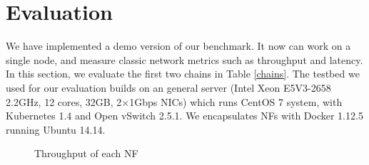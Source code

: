 \section{Evaluation}
We have implemented a demo version of our benchmark.
It now can work on a single node,
and measure classic network metrics such as throughput and latency.
In this section, we evaluate the first two chains in Table \ref{chains}. 
The testbed we used for our evaluation builds on an general server (Intel Xeon E5V3-2658 2.2GHz, 12 cores, 32GB, 2$\times$1Gbps NICs) which runs CentOS 7 system, with Kubernetes 1.4 and Open vSwitch 2.5.1. We encapsulates NFs with Docker 1.12.5 running Ubuntu 14.14. 


%

\begin{figure}[!t]
\centering
{}
\hfil
{}
\hfil
\caption{Throughput of each NF}
\label{throughput}
\end{figure}

